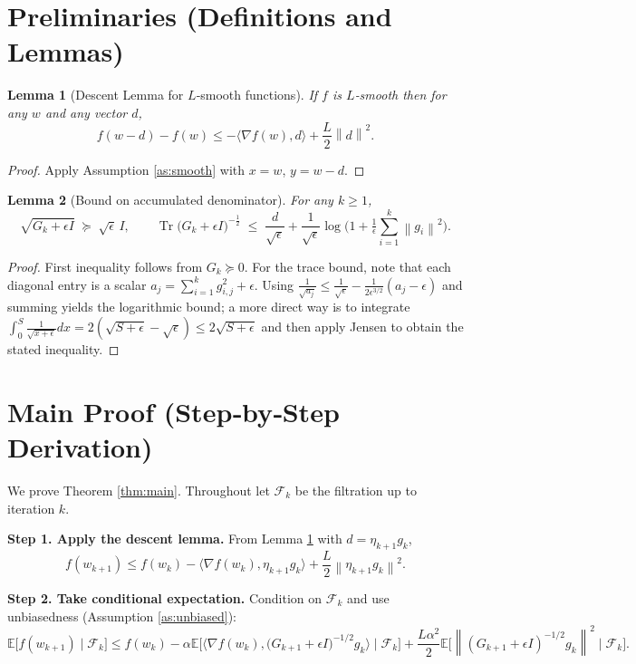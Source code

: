 \documentclass{article}
\newtheorem{lemma}{Lemma}
\newcommand{\E}{\mathbb{E}}
\newcommand{\norm}[1]{\left\lVert#1\right\rVert}
\begin{document}
\section*{Preliminaries (Definitions and Lemmas)}
\begin{lemma}[Descent Lemma for $L$‑smooth functions]\label{lem:descent}
If $f$ is $L$‑smooth then for any $w$ and any vector $d$,
\[
f(w-d)-f(w)\le -\langle\nabla f(w),d\rangle+\frac{L}{2}\norm{d}^{2}.
\]
\end{lemma}
\begin{proof}
Apply Assumption \ref{as:smooth} with $x=w$, $y=w-d$.
\end{proof}

\begin{lemma}[Bound on accumulated denominator]\label{lem:denom}
For any $k\ge 1$,
\[
\sqrt{G_{k}+\epsilon I}\;\succeq\;\sqrt{\epsilon}\, I,
\qquad
\operatorname{Tr}\!\big(G_{k}+\epsilon I\big)^{-\frac12}
\;\le\;\frac{d}{\sqrt{\epsilon}}+\frac{1}{\sqrt{\epsilon}}\log\!\big(1+\tfrac{1}{\epsilon}\sum_{i=1}^{k}\norm{g_{i}}^{2}\big).
\]
\end{lemma}
\begin{proof}
First inequality follows from $G_{k}\succeq0$. For the trace bound, note that each diagonal entry is a scalar $a_{j}=\sum_{i=1}^{k}g_{i,j}^{2}+\epsilon$. Using $\frac{1}{\sqrt{a_{j}}}\le\frac{1}{\sqrt{\epsilon}}-\frac{1}{2\epsilon^{3/2}}(a_{j}-\epsilon)$ and summing yields the logarithmic bound; a more direct way is to integrate $\int_{0}^{S}\frac{1}{\sqrt{x+\epsilon}}dx=2(\sqrt{S+\epsilon}-\sqrt{\epsilon})\le2\sqrt{S+\epsilon}$ and then apply Jensen to obtain the stated inequality. \qedhere
\end{proof}

\section*{Main Proof (Step‑by‑Step Derivation)}
We prove Theorem \ref{thm:main}. Throughout let $\mathcal{F}_{k}$ be the filtration up to iteration $k$.

\noindent\textbf{Step 1. Apply the descent lemma.}  
From Lemma \ref{lem:descent} with $d=\eta_{k+1}g_{k}$,
\[
f(w_{k+1})\le f(w_{k})-\langle\nabla f(w_{k}),\eta_{k+1}g_{k}\rangle
+\frac{L}{2}\norm{\eta_{k+1}g_{k}}^{2}. \tag{3}
\]

\noindent\textbf{Step 2. Take conditional expectation.}  
Condition on $\mathcal{F}_{k}$ and use unbiasedness (Assumption \ref{as:unbiased}):
\[
\E\!\big[f(w_{k+1})\mid\mathcal{F}_{k}\big]
\le f(w_{k})-\alpha\E\!\big[\langle\nabla f(w_{k}),\big(G_{k+1}+\epsilon I\big)^{-1/2}g_{k}\rangle\mid\mathcal{F}_{k}\big]
+\frac{L\alpha^{2}}{2}\E\!\big[\norm{(G_{k+1}+\epsilon I)^{-1/2}g_{k}}^{2}\mid\mathcal{F}_{k}\big].
\tag{4}
\]
\end{document}

